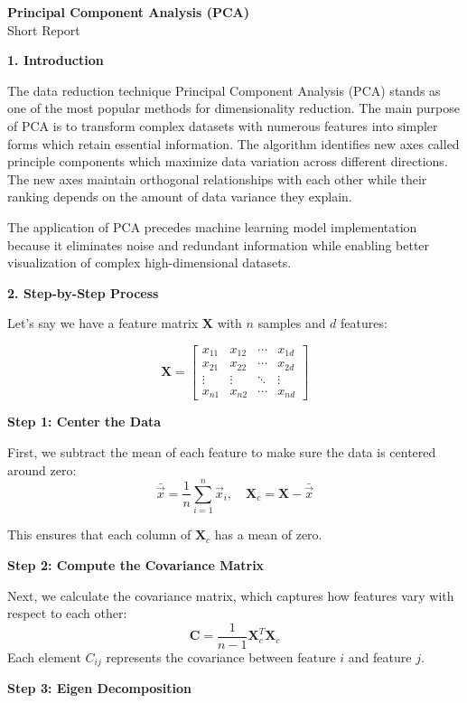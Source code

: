 \documentclass[12pt,a4paper]{article}
\begin{document}
\begin{center}
    \Large \textbf{Principal Component Analysis (PCA)}\\[0.5em]
    \normalsize Short Report
\end{center}

\textbf{1. Introduction}

The data reduction technique Principal Component Analysis (PCA) stands as one of the most popular methods for dimensionality reduction. The main purpose of PCA is to transform complex datasets with numerous features into simpler forms which retain essential information. The algorithm identifies new axes called principle components which maximize data variation across different directions. The new axes maintain orthogonal relationships with each other while their ranking depends on the amount of data variance they explain.

The application of PCA precedes machine learning model implementation because it eliminates noise and redundant information while enabling better visualization of complex high-dimensional datasets.

\textbf{2. Step-by-Step Process}

Let’s say we have a feature matrix $\mathbf{X}$ with $n$ samples and $d$ features:

\[
\mathbf{X} =
\begin{bmatrix}
x_{11} & x_{12} & \cdots & x_{1d} \\
x_{21} & x_{22} & \cdots & x_{2d} \\
\vdots & \vdots & \ddots & \vdots \\
x_{n1} & x_{n2} & \cdots & x_{nd}
\end{bmatrix}
\]

\textbf{Step 1: Center the Data}

First, we subtract the mean of each feature to make sure the data is centered around zero:
\[
\bar{\vec{x}} = \frac{1}{n} \sum_{i=1}^{n} \vec{x}_i, \quad
\mathbf{X}_c = \mathbf{X} - \bar{\vec{x}}
\]

This ensures that each column of $\mathbf{X}_c$ has a mean of zero.

\textbf{Step 2: Compute the Covariance Matrix}

Next, we calculate the covariance matrix, which captures how features vary with respect to each other:
\[
\mathbf{C} = \frac{1}{n - 1} \mathbf{X}_c^{T}\mathbf{X}_c
\]
Each element $C_{ij}$ represents the covariance between feature $i$ and feature $j$.

\textbf{Step 3: Eigen Decomposition}
\end{document}
